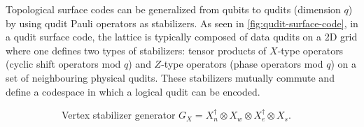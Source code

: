 Topological surface codes can be generalized from qubits to qudits (dimension $q$) by using qudit Pauli operators as stabilizers. As seen in \autoref{fig:qudit-surface-code}, in a qudit surface code, the lattice is typically composed of data qudits on a 2D grid where one defines two types of stabilizers: tensor products of $X$-type operators (cyclic shift operators mod $q$) and $Z$-type operators (phase operators mod $q$) on a set of neighbouring physical qudits. These stabilizers mutually commute and define a codespace in which a logical qudit can be encoded. 
\begin{figure}[H]
  \centering
  \begin{minipage}[t]{0.34\textwidth}
    \vspace{0pt}%
    \vspace{0ex}
    \begin{subfigure}[t]{\linewidth}
      \centering
      \caption{Vertex stabilizer generator $G_X=X^{\dagger}_n \otimes  X_w \otimes  X^{\dagger}_e \otimes  X_s$.}
      \label{fig:vertex}
    \end{subfigure}

    \vspace{2 ex}

    \begin{subfigure}[t]{\linewidth}
      \centering
\end{subfigure}
\end{minipage}
\end{figure}
